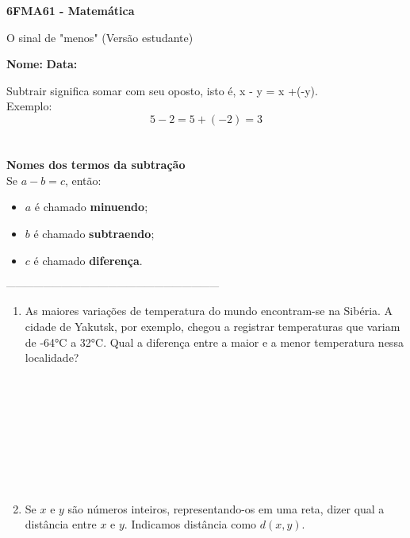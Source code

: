 \documentclass[a4paper,14pt]{article}
\begin{document}
	
	\noindent\textbf{6FMA61 - Matemática} 
	
	\begin{center}O sinal de "menos" (Versão estudante)
	\end{center}
	
	\noindent\textbf{Nome:} \underline{\hspace{10cm}}
	\noindent\textbf{Data:} \underline{\hspace{4cm}}
	
	\begin{multicols}{2}
    		\noindent Subtrair significa somar com seu oposto, isto é, x - y = x +(-y). \\
    		Exemplo: 
    		\begin{equation*}5 - 2 = 5 + (-2) = 3\end{equation*} \\\\
    		\textbf{Nomes dos termos da subtração} \\
    		Se $a - b = c$, então:
    		\begin{itemize}
    			\item $a$ é chamado \textbf{minuendo};
    			\item $b$ é chamado \textbf{subtraendo};
    			\item $c$ é chamado \textbf{diferença}.
    		\end{itemize}
    		\textsubscript{---------------------------------------------------------------------}
    		\begin{enumerate}
    			\item As maiores variações de temperatura do mundo encontram-se na Sibéria. A cidade de Yakutsk, por exemplo, chegou a registrar temperaturas que variam de -64°C a 32°C. Qual a diferença entre a maior e a menor temperatura nessa localidade? \\\\\\\\\\\\\\\\\\
    			\item Se $x$ e $y$ são números inteiros, representando-os em uma reta, dizer qual a distância entre $x$ e $y$. Indicamos distância como $d(x, y)$. \\\\\\\\

\end{enumerate}
\end{multicols}
\end{document}
